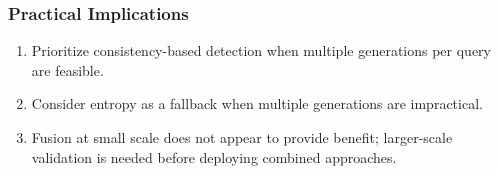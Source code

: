 \subsubsection{Practical Implications}

\begin{enumerate}
\item Prioritize consistency-based detection when multiple generations per query are feasible.
\item Consider entropy as a fallback when multiple generations are impractical.
\item Fusion at small scale does not appear to provide benefit; larger-scale validation is needed before deploying combined approaches.
\end{enumerate}

